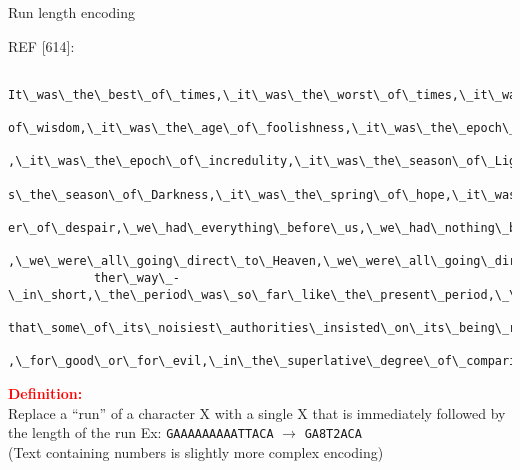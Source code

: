 \documentclass{beamer}
\newcommand{\red}[1]{\textcolor{red}{\textbf{#1}}}
\begin{document}
\begin{frame}{Run length encoding}
    \begin{center}
        \tiny REF [614]:
        \begin{verbatim}
            It\_was\_the\_best\_of\_times,\_it\_was\_the\_worst\_of\_times,\_it\_was\_the\_age\_\\
            of\_wisdom,\_it\_was\_the\_age\_of\_foolishness,\_it\_was\_the\_epoch\_of\_belief\\
            ,\_it\_was\_the\_epoch\_of\_incredulity,\_it\_was\_the\_season\_of\_Light,\_it\_wa\\
            s\_the\_season\_of\_Darkness,\_it\_was\_the\_spring\_of\_hope,\_it\_was\_the\_wint\\
            er\_of\_despair,\_we\_had\_everything\_before\_us,\_we\_had\_nothing\_before\_us\\
            ,\_we\_were\_all\_going\_direct\_to\_Heaven,\_we\_were\_all\_going\_direct\_the\_o\\
            ther\_way\_-\_in\_short,\_the\_period\_was\_so\_far\_like\_the\_present\_period,\_\\
            that\_some\_of\_its\_noisiest\_authorities\_insisted\_on\_its\_being\_received\\
            ,\_for\_good\_or\_for\_evil,\_in\_the\_superlative\_degree\_of\_comparison\_only.\$
        \end{verbatim}
    \end{center}
    \bigskip
    \normalsize \red{Definition:}\\
    Replace a “run” of a character X with a single X that is immediately followed by the length of the run
    Ex: \texttt{GAAAAAAAAATTACA} $\to$ \texttt{GA8T2ACA}\\
    (Text containing numbers is slightly more complex encoding)
\end{frame}
\end{document}
